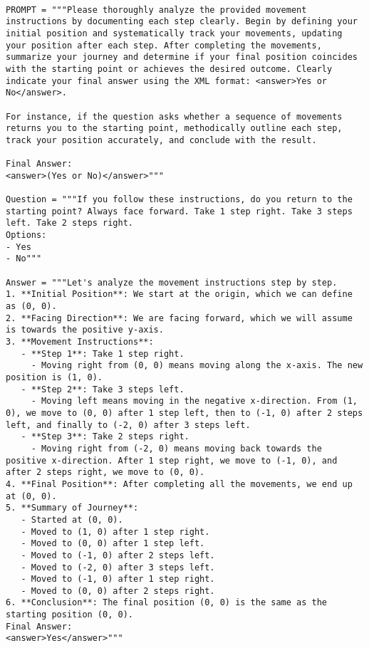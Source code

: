 \begin{tcolorbox}[title={\textbf{\small Optimize Function's Prompt}}, boxrule=2pt, arc=0mm, breakable]
\begin{verbatim}

PROMPT = """Please thoroughly analyze the provided movement instructions by documenting each step clearly. Begin by defining your initial position and systematically track your movements, updating your position after each step. After completing the movements, summarize your journey and determine if your final position coincides with the starting point or achieves the desired outcome. Clearly indicate your final answer using the XML format: <answer>Yes or No</answer>.

For instance, if the question asks whether a sequence of movements returns you to the starting point, methodically outline each step, track your position accurately, and conclude with the result.

Final Answer:
<answer>(Yes or No)</answer>"""

Question = """If you follow these instructions, do you return to the starting point? Always face forward. Take 1 step right. Take 3 steps left. Take 2 steps right.
Options:
- Yes
- No"""

Answer = """Let's analyze the movement instructions step by step.
1. **Initial Position**: We start at the origin, which we can define as (0, 0).
2. **Facing Direction**: We are facing forward, which we will assume is towards the positive y-axis.
3. **Movement Instructions**:
   - **Step 1**: Take 1 step right.
     - Moving right from (0, 0) means moving along the x-axis. The new position is (1, 0).
   - **Step 2**: Take 3 steps left.
     - Moving left means moving in the negative x-direction. From (1, 0), we move to (0, 0) after 1 step left, then to (-1, 0) after 2 steps left, and finally to (-2, 0) after 3 steps left.
   - **Step 3**: Take 2 steps right.
     - Moving right from (-2, 0) means moving back towards the positive x-direction. After 1 step right, we move to (-1, 0), and after 2 steps right, we move to (0, 0).
4. **Final Position**: After completing all the movements, we end up at (0, 0).
5. **Summary of Journey**:
   - Started at (0, 0).
   - Moved to (1, 0) after 1 step right.
   - Moved to (0, 0) after 1 step left.
   - Moved to (-1, 0) after 2 steps left.
   - Moved to (-2, 0) after 3 steps left.
   - Moved to (-1, 0) after 1 step right.
   - Moved to (0, 0) after 2 steps right.
6. **Conclusion**: The final position (0, 0) is the same as the starting position (0, 0).
Final Answer:
<answer>Yes</answer>"""

\end{verbatim}
\end{tcolorbox}


